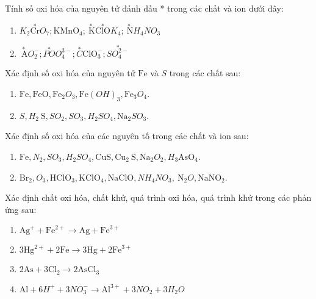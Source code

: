 \begin{bt}
	Tính số oxi hóa của nguyên tử đánh dấu * trong các chất và ion dưới đây:
	\begin{enumerate}
		\item $K_2\stackrel{*}{\mathrm{Cr}} O_7; \mathrm{KMnO}_4; \stackrel{*}{\mathrm{~K}} \stackrel{*}{\mathrm{ClO}} K_4; \stackrel{*}{\mathrm{~N}} H_4NO_3$
		\item $\stackrel{*}{\mathrm{~A}} O_2^{-}; \stackrel{*}{PO} O_4^{3-}; \stackrel{*}{C} \mathrm{ClO}_3^{-}; \stackrel{*}{SO_4^{2-}}$
	\end{enumerate}
\end{bt}

\begin{bt}
	Xác định số oxi hóa của nguyên tử $\mathrm{Fe}$ và $S$ trong các chất sau:
	\begin{enumerate}
		\item $\mathrm{Fe}, \mathrm{FeO}, \mathrm{Fe}_2O_3, \mathrm{Fe}(OH)_3, \mathrm{Fe}_3O_4$.
		\item $S, H_2\mathrm{~S}, SO_2, SO_3, H_2SO_4, \mathrm{Na}_2SO_3$.
	\end{enumerate}
\end{bt}

\begin{bt}
	Xác định số oxi hóa của các nguyên tố trong các chất và ion sau:
	\begin{enumerate}
		\item $\mathrm{Fe}, N_2, SO_3, H_2SO_4, \mathrm{CuS}, \mathrm{Cu}_2\mathrm{~S}, \mathrm{Na}_2O_2, H_3\mathrm{AsO}_4$.
		\item $\mathrm{Br}_2, O_3, \mathrm{HClO}_3, \mathrm{KClO}_4, \mathrm{NaClO}, NH_4NO_3, \mathrm{~N}_2O, \mathrm{NaNO}_2$.
	\end{enumerate}
\end{bt}
\begin{bt}
	Xác định chất oxi hóa, chất khử, quá trình oxi hóa, quá trình khử trong các phản ứng sau:
	\begin{enumerate}
		\item $\mathrm{Ag}^{+}+\mathrm{Fe}^{2+} \to \mathrm{Ag}+\mathrm{Fe}^{3+}$
		\item $3\mathrm{Hg}^{2+}+2\mathrm{Fe} \to 3\mathrm{Hg}+2\mathrm{Fe}^{3+}$
		\item $2\mathrm{As}+3\mathrm{Cl}_2\to 2\mathrm{AsCl}_3$
		\item $\mathrm{Al}+6H^{+}+3NO_3^{-} \to \mathrm{Al}^{3+}+3NO_2+3H_2O$
	\end{enumerate}
	\loigiai{}
\end{bt}

